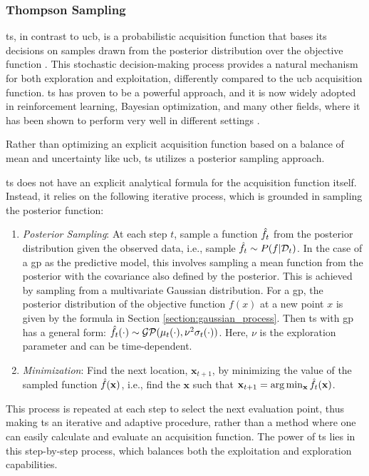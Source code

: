 \subsubsection{Thompson Sampling}
\label{section:thompson_sampling}

\acf{ts}, in contrast to \ac{ucb}, is a probabilistic acquisition function that bases its decisions on samples drawn from the posterior distribution over the objective function \citep{thompson1933likelihood, russo2018tutorial}. This stochastic decision-making process provides a natural mechanism for both exploration and exploitation, differently compared to the \ac{ucb} acquisition function. \ac{ts} has proven to be a powerful approach, and it is now widely adopted in reinforcement learning, Bayesian optimization, and many other fields, where it has been shown to perform very well in different settings \citep{agrawal2017thompson, chowdhury2017kernelized}.

Rather than optimizing an explicit acquisition function based on a balance of mean and uncertainty like \ac{ucb}, \ac{ts} utilizes a posterior sampling approach. 

\acf{ts} does not have an explicit analytical formula for the acquisition function itself. Instead, it relies on the following iterative process, which is grounded in sampling the posterior function:
\begin{enumerate}
    \item \textit{Posterior Sampling}: At each step $t$,  sample a function $\Hat{f}_t$ from the posterior distribution given the observed data, i.e., sample $\Hat{f}_t \sim P(f \vert \mathcal{D}_t)$. In the case of a \ac{gp} as the predictive model, this involves sampling a mean function from the posterior with the covariance also defined by the posterior. This is achieved by sampling from a multivariate Gaussian distribution. For a \ac{gp}, the posterior distribution of the objective function $f(x)$ at a new point $x$ is given by the formula in Section \ref{section:gaussian_process}. Then \ac{ts} with \ac{gp} has a general form: $\Hat{f}_t (\cdot) \sim \mathcal{GP}(\mu_t(\cdot), \nu^2 \sigma_t(\cdot))$. Here, $\nu$ is the exploration parameter and can be time-dependent. 
    
    \item \textit{Minimization}: Find the next location, $\mathbf{x}_{t+1}$, by minimizing the value of the sampled function $\Hat{f}(\mathbf{x})$, i.e., find the $\mathbf{x}$ such that $\mathbf{x}_{t+1} = \arg \min_\mathbf{x} \Hat{f}_t(\mathbf{x})$.
\end{enumerate}
This process is repeated at each step to select the next evaluation point, thus making \ac{ts} an iterative and adaptive procedure, rather than a method where one can easily calculate and evaluate an acquisition function. The power of \ac{ts} lies in this step-by-step process, which balances both the exploitation and exploration capabilities.

